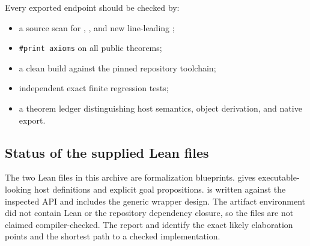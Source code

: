Every exported endpoint should be checked by:
\begin{itemize}
\item a source scan for , , and new line-leading ;
\item \texttt{\#print axioms} on all public theorems;
\item a clean build against the pinned repository toolchain;
\item independent exact finite regression tests;
\item a theorem ledger distinguishing host semantics, object derivation, and native export.
\end{itemize}

\subsection{Status of the supplied Lean files}

The two Lean files in this archive are formalization blueprints.   gives executable-looking host definitions and explicit goal propositions.   is written against the inspected  API and includes the generic wrapper design.  The artifact environment did not contain Lean or the repository dependency closure, so the files are not claimed compiler-checked.  The report and  identify the exact likely elaboration points and the shortest path to a checked implementation.
